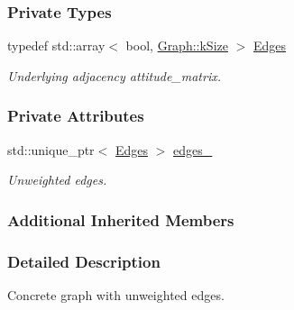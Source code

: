 \subsubsection*{Private Types}
\begin{DoxyCompactItemize}
\item 
\mbox{\label{classosse_1_1collaborate_1_1_graph_unweighted_a218e4872b092090509bc2483186de31a}} 
typedef std\+::array$<$ bool, \hyperlink{classosse_1_1collaborate_1_1_graph_a9c9828305d419d29fc1eed87a4520cd5}{Graph\+::k\+Size} $>$ \hyperlink{classosse_1_1collaborate_1_1_graph_unweighted_a218e4872b092090509bc2483186de31a}{Edges}
\begin{DoxyCompactList}\small\item\em Underlying adjacency attitude\+\_\+matrix. \end{DoxyCompactList}\end{DoxyCompactItemize}
\subsubsection*{Private Attributes}
\begin{DoxyCompactItemize}
\item 
\mbox{\label{classosse_1_1collaborate_1_1_graph_unweighted_ae1e5841b64a17371fbbf2dfffe396b45}} 
std\+::unique\+\_\+ptr$<$ \hyperlink{classosse_1_1collaborate_1_1_graph_unweighted_a218e4872b092090509bc2483186de31a}{Edges} $>$ \hyperlink{classosse_1_1collaborate_1_1_graph_unweighted_ae1e5841b64a17371fbbf2dfffe396b45}{edges\+\_\+}
\begin{DoxyCompactList}\small\item\em Unweighted edges. \end{DoxyCompactList}\end{DoxyCompactItemize}
\subsubsection*{Additional Inherited Members}


\subsubsection{Detailed Description}
Concrete graph with unweighted edges. 

